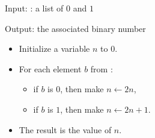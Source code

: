 \documentclass[11pt,class=report,crop=false]{standalone}
\begin{document}
\begin{activite}
\begin{enumerate}
  \begin{algorithme}
  Input:  : a list of $0$ and $1$ 
  
  Output: the associated binary number 

  \begin{itemize}
    \item Initialize a variable $n$ to $0$.

    
    \item For each element $b$ from  :
    
     \begin{itemize} 
       \item if $b$ is $0$, then make $n \leftarrow 2n$,
       \item if $b$ is $1$, then make $n \leftarrow 2n+1$.
     \end{itemize}    
         
    \item The result is the value of $n$.
  \end{itemize} 
             
 \end{algorithme}
 
\end{enumerate}

\end{activite}
  
  
\end{document}
